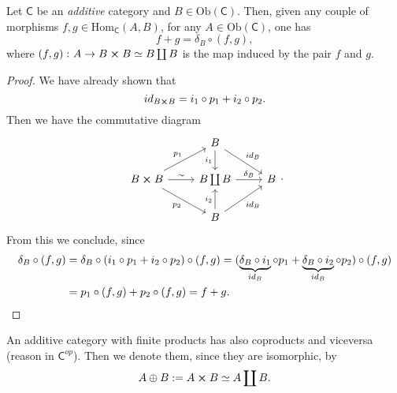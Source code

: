 \documentclass[../Main]{subfiles}
\begin{document}
\begin{lem}\label{lem:MorphismSumAdditiveCat}
	Let $\mathsf{C}$ be an {\em additive} category and
	$B \in \mathrm{Ob} \left(\mathsf{C}\right)$.
	Then, given any couple of morphisms 
	$f,g \in \mathrm{Hom}_{\mathsf{C}} \left( A, B \right)$, 
	for any $A \in \mathrm{Ob} \left(\mathsf{C}\right)$,
	one has
	\begin{equation}
		f + g = \delta_B \circ \left( f, g \right)
	,\end{equation} 
	where $\left( f, g\right)\colon A \to B \cross B \simeq B \coprod B$
	is the map induced by the pair $f$ and $g$.
\end{lem} 
\begin{proof}
	We have already shown that
	\begin{equation}
	id_{B \cross B} = i_1 \circ p_1 + i_2 \circ p_2
	.\end{equation} 
	Then we have the commutative diagram
	\begin{equation}
	\begin{tikzcd}
		&
		B \arrow[rd, "id_B", rightarrow] \arrow[d, "i_1"', rightarrow] & \\
		B \cross B \arrow[r, "\sim", rightarrow]
		\arrow[ru, "p_1", rightarrow] \arrow[rd, "p_2"', rightarrow] &
		B \coprod B \arrow[r, "\delta_B", rightarrow] &
		B \\
		&
		B \arrow[u, "i_2", rightarrow] \arrow[ru, "id_B"', rightarrow] &
	\end{tikzcd}
	.\end{equation} 
	From this we conclude, since
	\begin{align}
		\delta_B \circ \left( f,g \right) &=
		\delta_B \circ \left( i_1 \circ p_1 + i_2 \circ p_2 \right) \circ \left( f, g \right) =
		( \underbrace{\delta_B \circ i_1}_{id_B} \circ p_1 + 
		\underbrace{\delta_B \circ i_2}_{id_B} \circ p_2) \circ ( f,g ) \nonumber \\
		&=
		p_1 \circ \left( f,g \right) + p_2 \circ \left( f, g \right) = f + g \qedhere
	.\end{align} 
\end{proof}

\begin{rem}[Notation]
	An additive category with finite products
	has also coproducts and viceversa (reason in $\mathsf{C}^{op}$).
	Then we denote them, since they are isomorphic, by
	\begin{equation}
	A \oplus B := A \cross B \simeq A \coprod B
	.\end{equation} 
\end{rem}
\end{document}
